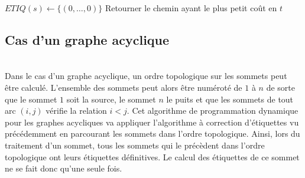 \documentclass[10pt,francais]{llncs}
\begin{document}
\begin{algorithm}\label{algo-fixation}
\caption{FIXATION~: Algorithme \`a fixation d'\'etiquettes}
\BlankLine
{}
\BlankLine


\BlankLine
$ETIQ(s) \leftarrow \{(0,\ldots,0)\}$
\BlankLine
{}
Retourner le chemin ayant le plus petit co\^ut en $t$\; 
\end{algorithm}

\subsection{Cas d'un graphe acyclique}\label{sub-resol-acycl}
~\\
Dans le cas d'un graphe acyclique, un ordre topologique sur les sommets peut \^etre calcul\'e. L'ensemble des sommets peut alors \^etre num\'erot\'e de $1$ \`a $n$ de sorte que le sommet $1$ soit la source, le sommet $n$ le puits et que les sommets de tout arc $(i,j)$ v\'erifie la relation $i<j$. Cet algorithme de programmation dynamique pour les graphes acycliques va appliquer l'algorithme \`a correction d'\'etiquettes vu pr\'ec\'edemment en parcourant les sommets dans l'ordre topologique. Ainsi, lors du traitement d'un sommet, tous les sommets qui le pr\'ec\`edent dans l'ordre topologique ont leurs \'etiquettes d\'efinitives. Le calcul des \'etiquettes de ce sommet ne se fait donc qu'une seule fois.
\end{document}
